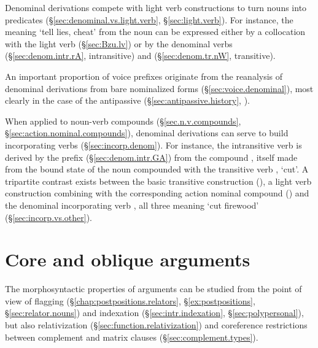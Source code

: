 Denominal derivations compete with light verb constructions to turn nouns into predicates (§\ref{sec:denominal.vs.light.verb}, §\ref{sec:light.verb}). For instance, the meaning `tell lies, cheat' from the noun  can be expressed either by a collocation with the light verb  (§\ref{sec:Bzu.lv}) or by the denominal verbs  (§\ref{sec:denom.intr.rA}, intransitive) and  (§\ref{sec:denom.tr.nW}, transitive).

An important proportion of voice prefixes originate from the reanalysis of denominal derivations from bare nominalized forms (§\ref{sec:voice.denominal}), most clearly in the case of the  antipassive (§\ref{sec:antipassive.history}, \citealt{jacques14antipassive}).

When applied to noun-verb compounds (§\ref{sec.n.v.compounds}, §\ref{sec:action.nominal.compounds}), denominal derivations can serve to build incorporating verbs (§\ref{sec:incorp.denom}). For instance, the intransitive verb  is derived by the prefix  (§\ref{sec:denom.intr.GA}) from the compound , itself made from the bound state  of the noun  compounded with the transitive verb , `cut'. A tripartite contrast exists between the basic transitive construction (), a light verb construction combining  with the corresponding action nominal compound () and the denominal incorporating verb , all three meaning `cut firewood' (§\ref{sec:incorp.vs.other}).


 \section{Core and oblique arguments } \label{sec:alignment.introduction}
The morphosyntactic properties of arguments can be studied from the point of view of flagging (§\ref{chap:postpositions.relators}, §\ref{ex:postpositions}, §\ref{sec:relator.nouns}) and indexation (§\ref{sec:intr.indexation}, §\ref{sec:polypersonal}), but also relativization (§\ref{sec:function.relativization}) and coreference restrictions between complement and matrix clauses (§\ref{sec:complement.types}).
 
